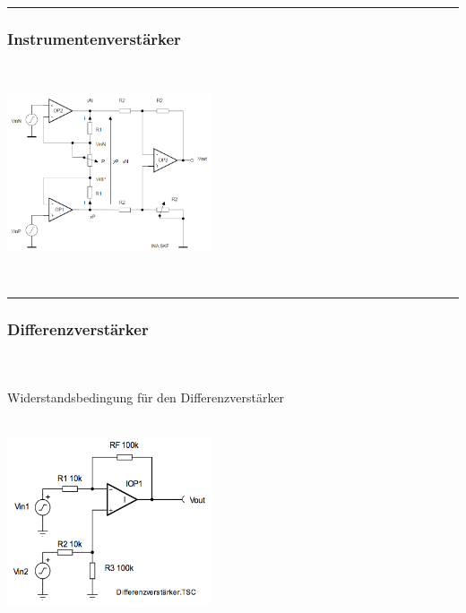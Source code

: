 		
\hrule

		\subsubsection{Instrumentenverstärker }
		\begin{minipage}[b]{12cm}
		\hspace*{10mm}\\
		\end{minipage}
		\begin{minipage}{6cm}
          	\includegraphics[width=6cm]{./bilder/Instrumentationsverstaerker.png} 
        \end{minipage}\\
		
\hrule

		\subsubsection{Differenzverstärker }
			\begin{minipage}[b]{12cm}
            	\hspace*{10mm}\\
            	\\ Widerstandsbedingung für den Differenzverstärker\\ \\
            	\hspace*{10mm}
            	\hspace{15mm}
            	\hfill
            \end{minipage}
			\begin{minipage}{6cm}
            	\includegraphics[width=6cm]{./bilder/differenzver.png}
            \end{minipage}\\


